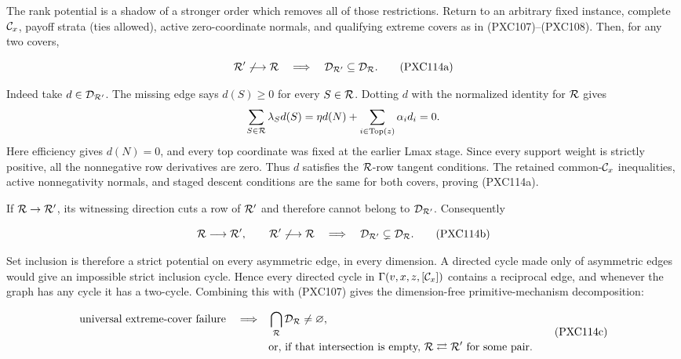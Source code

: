 \documentclass[11pt]{article}
\begin{document}
The rank potential is a shadow of a stronger order which removes all of
those restrictions.  Return to an arbitrary fixed instance, complete
\({\cal C}_x\), payoff strata (ties allowed), active zero-coordinate normals,
and qualifying extreme covers as in (PXC107)--(PXC108).  Then, for any two
covers,

\begin{equation}
 {\cal R}'\not\longrightarrow{\cal R}
 \quad\Longrightarrow\quad
 {\cal D}_{{\cal R}'}\subseteq{\cal D}_{\cal R}.             \tag{PXC114a}
\end{equation}

Indeed take \(d\in{\cal D}_{{\cal R}'}\).  The missing edge says
\(d(S)\ge0\) for every \(S\in{\cal R}\).  Dotting \(d\) with the normalized
identity for \({\cal R}\) gives
\[
 \sum_{S\in{\cal R}}\lambda_Sd(S)
 =\eta d(N)+\sum_{i\in\operatorname{Top}(z)}\alpha_i d_i=0.
\]
Here efficiency gives \(d(N)=0\), and every top coordinate was fixed at the
earlier Lmax stage.  Since every support weight is strictly positive, all
the nonnegative row derivatives are zero.  Thus \(d\) satisfies the
\({\cal R}\)-row tangent conditions.  The retained common-\({\cal C}_x\)
inequalities, active nonnegativity normals, and staged descent conditions are
the same for both covers, proving (PXC114a).

If \({\cal R}\to{\cal R}'\), its witnessing direction cuts a row of
\({\cal R}'\) and therefore cannot belong to
\({\cal D}_{{\cal R}'}\).  Consequently

\begin{equation}
 {\cal R}\longrightarrow{\cal R}',\qquad
 {\cal R}'\not\longrightarrow{\cal R}
 \quad\Longrightarrow\quad
 {\cal D}_{{\cal R}'}\subsetneq{\cal D}_{\cal R}.            \tag{PXC114b}
\end{equation}

Set inclusion is therefore a strict potential on every asymmetric edge,
in every dimension.  A directed cycle made only of asymmetric edges would
give an impossible strict inclusion cycle.  Hence every directed cycle in
\(\Gamma(v,x,z,[{\cal C}_x])\) contains a reciprocal edge, and whenever the
graph has any cycle it has a two-cycle.  Combining this with (PXC107) gives
the dimension-free primitive-mechanism decomposition:

\begin{equation}
\begin{split}
\text{universal extreme-cover failure}\quad\Longrightarrow\quad
&\bigcap_{\cal R}{\cal D}_{\cal R}\ne\varnothing,\\
&\text{or, if that intersection is empty, }
 {\cal R}\rightleftarrows{\cal R}'\text{ for some pair.}
\end{split}
                                                               \tag{PXC114c}
\end{equation}
\end{document}
